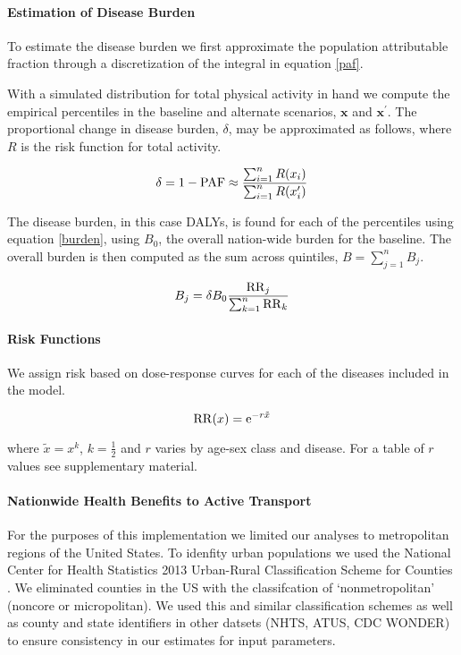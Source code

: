 \paragraph{Estimation of Disease Burden}

To estimate the disease burden we first approximate the population
attributable fraction through a discretization of the integral in
equation \ref{paf}.  


With a simulated distribution for total physical activity in hand we
compute the empirical percentiles in the baseline and alternate
scenarios, $\mathbf{x}$ and $\mathbf{x}^\prime$. The proportional
change in disease burden, $\delta$, may be approximated as follows,
where $R$ is the risk function for total activity.

\begin{equation}
\delta = 1 - \mathrm{PAF} \approx \frac{\sum_{i=1}^n R(x_i)}{\sum_{i=1}^n R(x_i^\prime)}
\end{equation}

The disease burden, in this case DALYs, is found for each of the
percentiles using equation \ref{burden}, using $B_0$, the overall nation-wide burden for
the baseline.  The overall burden is then computed as the sum across
quintiles, $B=\sum_{j=1}^n B_j$.

\begin{equation}
B_j = \delta B_0\frac{\mathrm{RR}_j}{\sum_{k=1}^n \mathrm{RR}_k}\label{burden}
\end{equation}

\paragraph{Risk Functions}

We assign risk based on dose-response curves for each of the diseases
included in the model.

\begin{equation}
\mathrm{RR}(x) = \mathrm{e}^{-r \tilde{x}}
\end{equation}

where $\tilde{x} = x^k$, $k=\frac{1}{2}$ and $r$ varies by age-sex
class and disease.  For a table of $r$ values see supplementary
material.

\paragraph{Nationwide Health Benefits to Active Transport}

For the purposes of this implementation we limited our analyses to
metropolitan regions of the United States. To idenfity urban
populations we used the National Center for Health Statistics 2013
Urban-Rural Classification Scheme for Counties \cite{ingram2014}. We
eliminated counties in the US with the classifcation of
`nonmetropolitan' (noncore or micropolitan). We used this and similar
classification schemes as well as county and state identifiers in
other datsets (NHTS, ATUS, CDC WONDER) to ensure consistency in our
estimates for input parameters.

